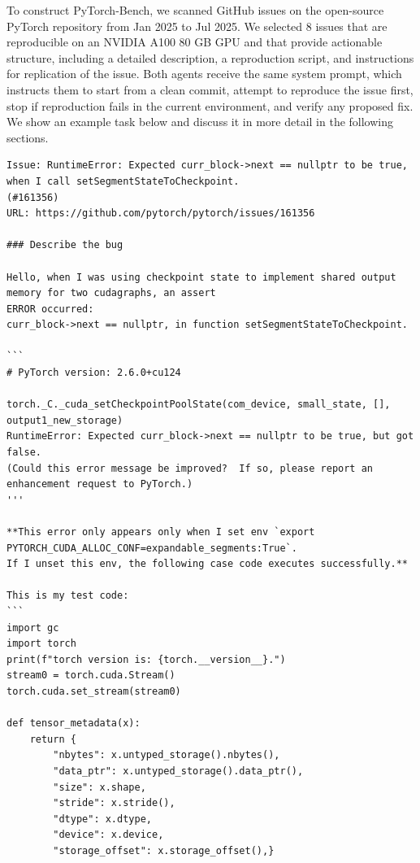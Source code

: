 To construct PyTorch-Bench, we scanned GitHub issues on the open-source PyTorch repository \citep{pytorch2025} from Jan 2025 to Jul 2025. We selected 8 issues that are reproducible on an NVIDIA A100 80 GB GPU and that provide actionable structure, including a detailed description, a reproduction script, and instructions for replication of the issue. Both agents receive the same system prompt, which instructs them to start from a clean commit, attempt to reproduce the issue first, stop if reproduction fails in the current environment, and verify any proposed fix. We show an example task below and discuss it in more detail in the following sections.

\begin{tcolorbox}[colback=white,  %
                   colframe=black,    %
                   coltext=metablue,      %
                   breakable,
                   fontupper=\scriptsize\fontfamily{pcr}\selectfont]  %
\begin{verbatim}
Issue: RuntimeError: Expected curr_block->next == nullptr to be true,  when I call setSegmentStateToCheckpoint. 
(#161356)
URL: https://github.com/pytorch/pytorch/issues/161356

### Describe the bug

Hello, when I was using checkpoint state to implement shared output memory for two cudagraphs, an assert 
ERROR occurred:
curr_block->next == nullptr, in function setSegmentStateToCheckpoint.

```
# PyTorch version: 2.6.0+cu124

torch._C._cuda_setCheckpointPoolState(com_device, small_state, [], output1_new_storage)
RuntimeError: Expected curr_block->next == nullptr to be true, but got false.  
(Could this error message be improved?  If so, please report an enhancement request to PyTorch.)
'''

**This error only appears only when I set env `export PYTORCH_CUDA_ALLOC_CONF=expandable_segments:True`.
If I unset this env, the following case code executes successfully.**

This is my test code:
```
import gc
import torch
print(f"torch version is: {torch.__version__}.")
stream0 = torch.cuda.Stream()
torch.cuda.set_stream(stream0)

def tensor_metadata(x):
    return {
        "nbytes": x.untyped_storage().nbytes(),
        "data_ptr": x.untyped_storage().data_ptr(),
        "size": x.shape,
        "stride": x.stride(),
        "dtype": x.dtype,
        "device": x.device,
        "storage_offset": x.storage_offset(),}


\end{verbatim}
\end{tcolorbox}
